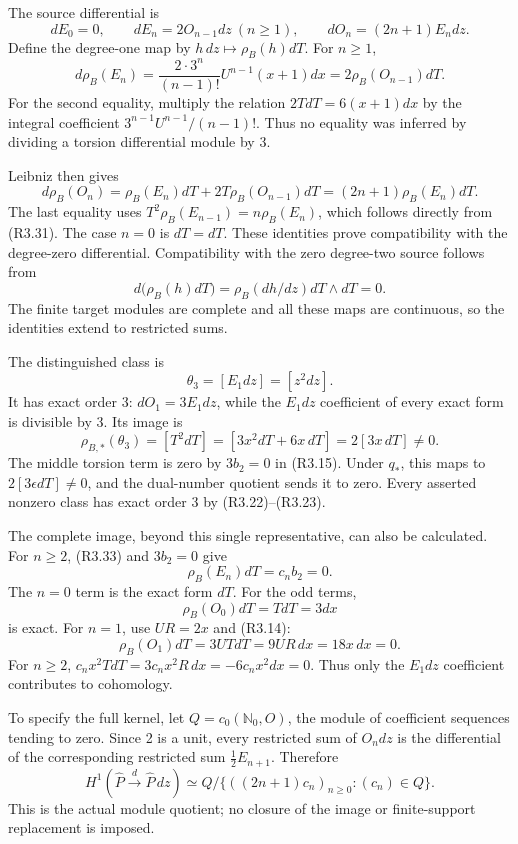 \documentclass[
]{article}
\begin{document}
The source differential is \[
dE_0=0,\qquad dE_n=2O_{n-1}dz\ (n\ge1),\qquad
dO_n=(2n+1)E_n dz.
\tag{R3.38}
\] Define the degree-one map by \(h\,dz\mapsto\rho_B(h)dT\). For
\(n\ge1\), \[
d\rho_B(E_n)
=\frac{2\cdot3^n}{(n-1)!}U^{n-1}(x+1)dx
=2\rho_B(O_{n-1})dT.
\tag{R3.39}
\] For the second equality, multiply the relation \(2TdT=6(x+1)dx\) by
the integral coefficient \(3^{n-1}U^{n-1}/(n-1)!\). Thus no equality was
inferred by dividing a torsion differential module by 3.

Leibniz then gives \[
d\rho_B(O_n)=\rho_B(E_n)dT+2T\rho_B(O_{n-1})dT
=(2n+1)\rho_B(E_n)dT.
\] The last equality uses \(T^2\rho_B(E_{n-1})=n\rho_B(E_n)\), which
follows directly from (R3.31). The case \(n=0\) is \(dT=dT\). These
identities prove compatibility with the degree-zero differential.
Compatibility with the zero degree-two source follows from \[
d\bigl(\rho_B(h)dT\bigr)=\rho_B(dh/dz)dT\wedge dT=0.
\] The finite target modules are complete and all these maps are
continuous, so the identities extend to restricted sums.

The distinguished class is \[
\theta_3=[E_1dz]=[z^2dz].
\] It has exact order 3: \(dO_1=3E_1dz\), while the \(E_1dz\)
coefficient of every exact form is divisible by 3. Its image is \[
\rho_{B,*}(\theta_3)
=[T^2dT]=[3x^2dT+6x\,dT]
=2[3x\,dT]\ne0.
\tag{R3.40}
\] The middle torsion term is zero by \(3b_2=0\) in (R3.15). Under
\(q_*\), this maps to \(2[3\epsilon dT]\ne0\), and the dual-number
quotient sends it to zero. Every asserted nonzero class has exact order
3 by (R3.22)--(R3.23).

The complete image, beyond this single representative, can also be
calculated. For \(n\ge2\), (R3.33) and \(3b_2=0\) give \[
\rho_B(E_n)dT=c_nb_2=0.
\] The \(n=0\) term is the exact form \(dT\). For the odd terms, \[
\rho_B(O_0)dT=TdT=3dx
\] is exact. For \(n=1\), use \(UR=2x\) and (R3.14): \[
\rho_B(O_1)dT=3UTdT=9UR\,dx=18x\,dx=0.
\] For \(n\ge2\), \(c_nx^2TdT=3c_nx^2R\,dx=-6c_nx^2dx=0\). Thus only the
\(E_1dz\) coefficient contributes to cohomology.

To specify the full kernel, let \(Q=c_0(\mathbb N_0,O)\), the module of
coefficient sequences tending to zero. Since 2 is a unit, every
restricted sum of \(O_n dz\) is the differential of the corresponding
restricted sum \(\frac12 E_{n+1}\). Therefore \[
H^1(\widehat P\xrightarrow{d}\widehat P\,dz)
\simeq Q/\{((2n+1)c_n)_{n\ge0}:(c_n)\in Q\}.
\tag{R3.41}
\] This is the actual module quotient; no closure of the image or
finite-support replacement is imposed.
\end{document}
